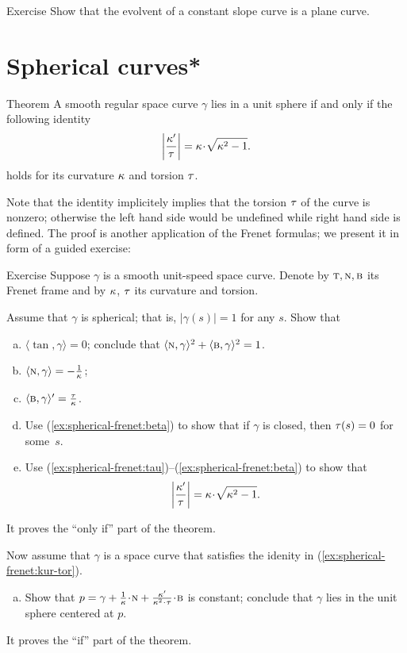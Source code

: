 \begin{thm}{Exercise}\label{ex:evolvent-constant-slope}
Show that the evolvent of a constant slope curve is a plane curve.
\end{thm}

\section{Spherical curves*}

\begin{thm}{Theorem}
A smooth regular space curve $\gamma$ lies in a unit sphere if and only if 
the following identity 
\[\left|\frac{\kur'}{\tor}\right|=\kur\cdot\sqrt{\kur^2-1}.\]
holds for its curvature $\kappa$ and torsion $\tau$.
\end{thm}

Note that the identity implicitely implies that the torsion $\tau$ of the curve is nonzero;
otherwise the left hand side would be undefined while right hand side is defined.
The proof is another application of the Frenet formulas;
we present it in form of a guided exercise:

\begin{thm}{Exercise}\label{ex:spherical-frenet}
Suppose $\gamma$ is a smooth unit-speed space curve.
Denote by $\textsc{t},\textsc{n},\textsc{b}$ its Frenet frame and by $\kappa$, $\tau$ its curvature and torsion.

\smallskip

Assume that $\gamma$ is spherical; that is, $|\gamma(s)|=1$ for any $s$.
Show that

\begin{enumerate}[(a)]
\item\label{ex:spherical-frenet:tau} $\langle\tan,\gamma\rangle=0$; conclude that $\langle\textsc{n},\gamma\rangle^2+\langle\textsc{b},\gamma\rangle^2=1$.
\item\label{ex:spherical-frenet:nu} $\langle\textsc{n},\gamma\rangle=-\tfrac1{\kappa}$;
\item\label{ex:spherical-frenet:beta} $\langle\textsc{b},\gamma\rangle'=\tfrac{\tau}{\kappa}$.
\item\label{ex:spherical-frenet:beta+}
Use (\ref{ex:spherical-frenet:beta}) to show that if $\gamma$ is closed, then $\tau(s)=0$ for some~$s$.
\item\label{ex:spherical-frenet:kur-tor} Use (\ref{ex:spherical-frenet:tau})--(\ref{ex:spherical-frenet:beta}) to show that 
\[\left|\frac{\kur'}{\tor}\right|=\kur\cdot\sqrt{\kur^2-1}.\]
\setcounter{lastnumber}{\value{enumi}}
\end{enumerate}
It proves the ``only if'' part of the theorem.

\smallskip

Now assume that $\gamma$ is a space curve that satisfies the idenity in (\ref{ex:spherical-frenet:kur-tor}).
\begin{enumerate}[(a)]
\setcounter{enumi}{\value{lastnumber}}
\item Show that $p=\gamma+\tfrac1\kur\cdot \norm+\tfrac{\kur'}{\kur^2\cdot\tor}\cdot\bi$ is constant; conclude that $\gamma$ lies in the unit sphere centered at $p$.
\end{enumerate}
It proves the ``if'' part of the theorem.
\end{thm}

